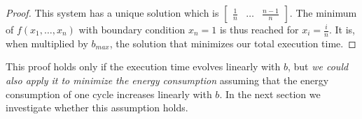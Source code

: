 \begin{proof}
    This system has a unique solution which is $\begin{bmatrix} \frac{1}{n} & \dots
    & \frac{n-1}{n} \end{bmatrix}$.  The minimum of $f(x_1,\dots,x_n)$ with
    boundary condition $x_n=1$ is thus reached for $x_i = \frac{i}{n}$.  It
    is, when multiplied by $b_{max}$, the solution that minimizes our total
    execution time.

\end{proof}

   This proof holds only if the execution time evolves linearly with $b$, but
   \textit{we could also apply it to minimize the energy consumption} assuming
   that the energy consumption of one cycle increases linearly with $b$. In the
   next section we investigate whether this assumption holds.

